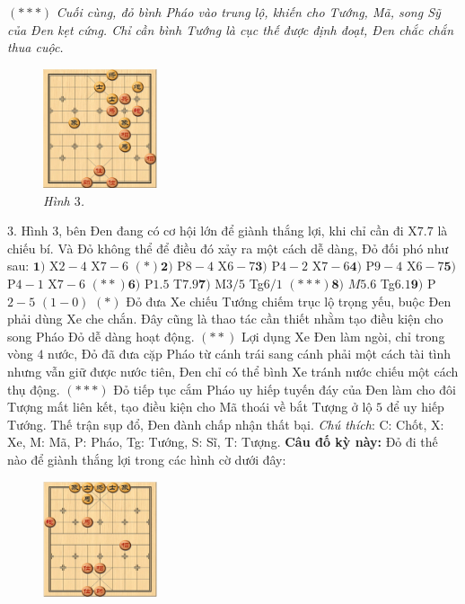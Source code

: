 \begin{multicols}{2}
	\vskip 0.05cm
	$(***)$ \textit{Cuối cùng, đỏ bình Pháo vào trung lộ, khiến cho Tướng, Mã, song Sỹ của Đen kẹt cứng. Chỉ cần bình Tướng là cục thế được định đoạt, Đen chắc chắn thua cuộc.} 
	\begin{figure}[H]
		\vspace*{-5pt}
		\centering
		\captionsetup{labelformat= empty, justification=centering}
		\includegraphics[width= 0.3\textwidth]{3}
		\caption{\small\textit{\color{gocco}Hình $3$.}}
		\vspace*{-10pt}
	\end{figure}
	$3.$ Hình $3$, bên Đen đang có cơ hội lớn để \linebreak giành thắng lợi, khi chỉ cần đi X$7.7$ là chiếu bí. Và Đỏ không thể để điều đó xảy ra một cách dễ dàng, Đỏ đối phó như sau:
	\vskip 0.05cm
	$\pmb{1)}$	X$2-4$ X$7-6$ $(*)$\quad $\pmb{2)}$ P$8-4$ X$6-7$\quad $\pmb{3)}$ P$4-2$ X$7-6$\quad $\pmb{4)}$ P$9-4$ X$6-7$\quad $\pmb{5)}$ P$4-1$ X$7-6$ $(**)$\quad $\pmb{6)}$ P$1.5$ T$7.9$\quad $\pmb{7)}$ M$3/5$ Tg$6/1$ $(***)$\quad $\pmb{8)}$ $M5.6$ Tg$6.1$\quad $\pmb{9)}$ P$2-5$ $(1-0)$
	\vskip 0.05cm
	$(*)$ Đỏ đưa Xe chiếu Tướng chiếm trục lộ trọng yếu, buộc Đen phải dùng Xe che chắn. Đây cũng là thao tác cần thiết nhằm tạo điều kiện cho song Pháo Đỏ dễ dàng hoạt động.
	\vskip 0.05cm
	$(**)$ Lợi dụng Xe Đen làm ngòi, chỉ trong vòng $4$ nước, Đỏ đã đưa cặp Pháo từ cánh trái sang cánh phải một cách tài tình nhưng vẫn giữ được nước tiên, Đen chỉ có thể bình Xe tránh nước chiếu một cách thụ động.
	\vskip 0.05cm
	$(***)$ Đỏ tiếp tục cắm Pháo uy hiếp tuyến đáy của Đen làm cho đôi Tượng mất liên kết, tạo điều kiện cho Mã thoái về bắt Tượng ở lộ $5$ để uy hiếp Tướng. Thế trận sụp đổ, Đen đành chấp nhận thất bại.
	\vskip 0.05cm
	\textit{Chú thích}: C: Chốt, X: Xe, M: Mã, P: Pháo, Tg: Tướng, S: Sĩ, T: Tượng. 
	\vskip 0.05cm
		\textbf{\color{gocco}Câu đố kỳ này:} Đỏ đi thế nào để giành thắng lợi trong các hình cờ dưới đây:
			\begin{figure}[H]
				\vspace*{5pt}
				\centering
				\captionsetup{labelformat= empty, justification=centering}
				\includegraphics[width= 0.3\textwidth]{4}

\end{figure}
\end{multicols}
